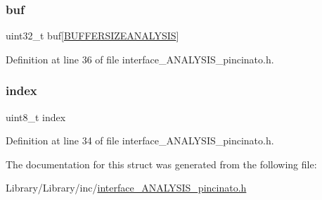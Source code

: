 \mbox{\label{struct_data_buffer_a879b8a6fa7f2626814e9c149bdfc3139}} 
\subsubsection{\texorpdfstring{buf}{buf}}
{\footnotesize\ttfamily uint32\+\_\+t buf\mbox{[}\mbox{\hyperlink{interface___a_n_a_l_y_s_i_s__pincinato_8h_a8d58dfb2133bff91e140c30b2c72ed04}{B\+U\+F\+F\+E\+R\+S\+I\+Z\+E\+A\+N\+A\+L\+Y\+S\+IS}}\mbox{]}}



Definition at line 36 of file interface\+\_\+\+A\+N\+A\+L\+Y\+S\+I\+S\+\_\+pincinato.\+h.

\mbox{\label{struct_data_buffer_aae5a12e607d0f782506d9e6ec6179c64}} 
\subsubsection{\texorpdfstring{index}{index}}
{\footnotesize\ttfamily uint8\+\_\+t index}



Definition at line 34 of file interface\+\_\+\+A\+N\+A\+L\+Y\+S\+I\+S\+\_\+pincinato.\+h.



The documentation for this struct was generated from the following file\+:\begin{DoxyCompactItemize}
\item 
Library/\+Library/inc/\mbox{\hyperlink{interface___a_n_a_l_y_s_i_s__pincinato_8h}{interface\+\_\+\+A\+N\+A\+L\+Y\+S\+I\+S\+\_\+pincinato.\+h}}\end{DoxyCompactItemize}

